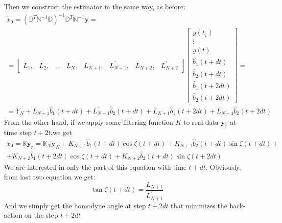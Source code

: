 Then we construct the estimator in the same way, as before:
\begin{multline}
 \tilde{x}_0 = (\mathbb{D}^T\mathbb{N}^{-1}\mathbb{D})^{-1}\mathbb{D}^T\mathbb{N}^{-1}\mathbf{y} = \\ =
\begin{bmatrix}
 L_1, & L_2, & \hdots & L_N, & L_{N+1}, & L_{N+1}^{'}, & L_{N+2}, & L_{N+2}^{'}
\end{bmatrix}
\begin{bmatrix}
 y(t_1)\\\vdots\\ y(t) \\ \hat{b}_1(t+dt)\\ \hat{b}_2(t+dt)\\ \hat{b}_1(t+2dt)\\ \hat{b}_2(t+2dt)
\end{bmatrix}
=\\ =Y_N + L_{N+1}\hat{b}_1(t+dt)+L_{N+1}^{'}\hat{b}_2(t+dt)+L_{N+1}\hat{b}_1(t+2dt)+L_{N+1}^{'}\hat{b}_2(t+2dt)
\end{multline}
From the other hand, if we apply some filtering function $K$ to real data $\mathbf{y}_r$ at time step $t+2t$,we get
\begin{multline}
 \tilde{x}_0 = \mathbb{K}\mathbf{y}_r = \mathbb{K}_N\mathbf{y}_N + K_{N+1}\hat{b}_1(t+dt)\cos\zeta(t+dt)+K_{N+1}\hat{b}_2(t+dt)\sin\zeta(t+dt)+\\+ K_{N+2}\hat{b}_1(t+2dt)\cos\zeta(t+dt)+K_{N+2}\hat{b}_2(t+dt)\sin\zeta(t+2dt)
\end{multline}
We are interested in only the part of this equation with time $t+dt$. Obviously, from last two equation we get:
\begin{equation}
 \tan \zeta(t+dt) = \frac{L_{N+1}}{L_{N+1}^{'}}
\end{equation}
And we simply get the homodyne angle at step $t+2dt$ that minimizes the back-action on the step $t+2dt$